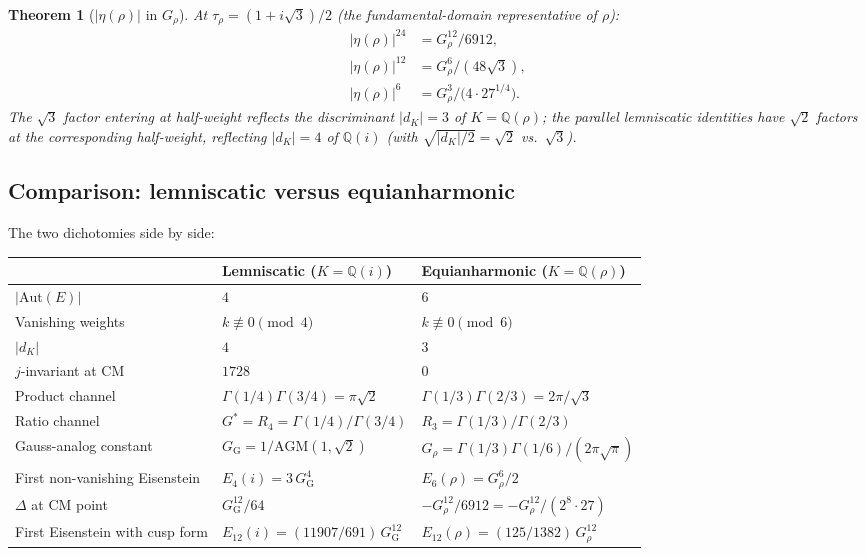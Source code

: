 \documentclass[11pt]{article}
\newtheorem{theorem}{Theorem}[section]
\theoremstyle{definition}
\theoremstyle{remark}
\newcommand{\Gs}{G^{*}}
\newcommand{\GG}{G_{\!\scriptscriptstyle\mathrm{G}}}
\newcommand{\Q}{\mathbb{Q}}
\newcommand{\AGM}{\mathrm{AGM}}
\newcommand{\Aut}{\mathrm{Aut}}
\begin{document}
\begin{theorem}[$|\eta(\rho)|$ in $G_\rho$]\label{thm:rho-eta}
At $\tau_\rho = (1 + i\sqrt 3)/2$ (the fundamental-domain representative of $\rho$):
\begin{align}
|\eta(\rho)|^{24} &= G_\rho^{12} / 6912, \\
|\eta(\rho)|^{12} &= G_\rho^6 / (48\sqrt 3), \\
|\eta(\rho)|^6 &= G_\rho^3 / \bigl(4 \cdot 27^{1/4}\bigr).
\end{align}
The $\sqrt 3$ factor entering at half-weight reflects the discriminant
$|d_K| = 3$ of $K = \Q(\rho)$; the parallel lemniscatic identities have
$\sqrt 2$ factors at the corresponding half-weight, reflecting
$|d_K| = 4$ of $\Q(i)$ (with $\sqrt{|d_K|/2} = \sqrt 2$ vs.\ $\sqrt 3$).
\end{theorem}

\subsection{Comparison: lemniscatic versus equianharmonic}

The two dichotomies side by side:

\begin{center}
\begin{tabular}{lll}
\toprule
& Lemniscatic ($K = \Q(i)$) & Equianharmonic ($K = \Q(\rho)$) \\
\midrule
$|\Aut(E)|$ & $4$ & $6$ \\
Vanishing weights & $k \not\equiv 0 \pmod 4$ & $k \not\equiv 0 \pmod 6$ \\
$|d_K|$ & $4$ & $3$ \\
$j$-invariant at CM & $1728$ & $0$ \\
Product channel & $\Gamma(1/4)\Gamma(3/4) = \pi\sqrt 2$ & $\Gamma(1/3)\Gamma(2/3) = 2\pi/\sqrt 3$ \\
Ratio channel & $\Gs = R_4 = \Gamma(1/4)/\Gamma(3/4)$ & $R_3 = \Gamma(1/3)/\Gamma(2/3)$ \\
Gauss-analog constant & $\GG = 1/\AGM(1,\sqrt 2)$ & $G_\rho = \Gamma(1/3)\Gamma(1/6)/(2\pi\sqrt\pi)$ \\
First non-vanishing Eisenstein & $E_4(i) = 3\,\GG^4$ & $E_6(\rho) = G_\rho^6/2$ \\
$\Delta$ at CM point & $\GG^{12}/64$ & $-G_\rho^{12}/6912 = -G_\rho^{12}/(2^8 \cdot 27)$ \\
First Eisenstein with cusp form & $E_{12}(i) = (11907/691)\,\GG^{12}$ & $E_{12}(\rho) = (125/1382)\,G_\rho^{12}$ \\
\bottomrule
\end{tabular}
\end{center}
\end{document}
